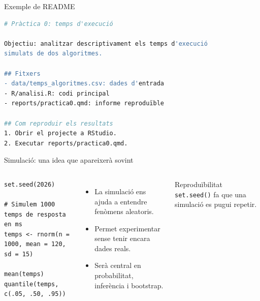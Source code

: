 \documentclass[10pt,aspectratio=169]{beamer}
\begin{document}
\begin{frame}[fragile]{Exemple de README}
\begin{lstlisting}[language=bash]
# Pràctica 0: temps d'execució

Objectiu: analitzar descriptivament els temps d'execució
simulats de dos algoritmes.

## Fitxers
- data/temps_algoritmes.csv: dades d'entrada
- R/analisi.R: codi principal
- reports/practica0.qmd: informe reproduïble

## Com reproduir els resultats
1. Obrir el projecte a RStudio.
2. Executar reports/practica0.qmd.
\end{lstlisting}
\end{frame}

\begin{frame}[fragile]{Simulació: una idea que apareixerà sovint}
\begin{columns}[T]
\begin{lstlisting}
set.seed(2026)

# Simulem 1000 temps de resposta en ms
temps <- rnorm(n = 1000, mean = 120, sd = 15)

mean(temps)
quantile(temps, c(.05, .50, .95))
\end{lstlisting}

\begin{itemize}
  \item La simulació ens ajuda a entendre fenòmens aleatoris.
  \item Permet experimentar sense tenir encara dades reals.
  \item Serà central en probabilitat, inferència i bootstrap.
\end{itemize}

\begin{alertblock}{Reproduïbilitat}
\texttt{set.seed()} fa que una simulació es pugui repetir.
\end{alertblock}
\end{columns}
\end{frame}
\end{document}
